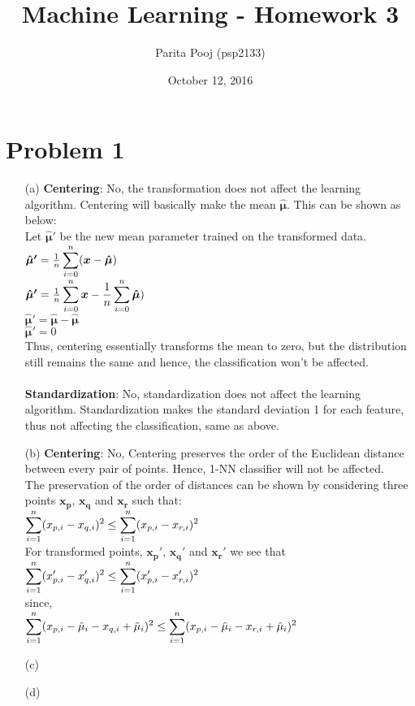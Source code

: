 \documentclass[fleqn]{article}
\title{Machine Learning - Homework 3}
\author{Parita Pooj (psp2133)}
\date{October 12, 2016}
\begin{document}
\maketitle
\setcounter{secnumdepth}{0}
\section{Problem 1}{}
\begin{itemize}
        \item[(a)]
		\textbf{Centering}: No, the transformation does not affect the learning algorithm.
		Centering will basically make the mean $\bm{\hat{\mu}}$. This can be shown as below:\\
		Let $\bm{\hat{\mu}'}$ be the new mean parameter trained on the transformed data.
		$ \bm{\hat{\mu}'} = \frac{1}{n} \smashoperator{\sum_{i = 0}^{n}} (\bm{x} - \bm{\hat{\mu}})$ \\
		$ \bm{\hat{\mu}'} = \frac{1}{n} \smashoperator{\sum_{i = 0}^{n}} \bm{x} 
		                  - \frac{1}{n} \smashoperator{\sum_{i = 0}^{n}} \bm{\hat{\mu}})$ \\
		$ \bm{\hat{\mu}'} = \bm{\hat{\mu}} - \bm{\hat{\mu}} $ \\
		$ \bm{\hat{\mu}'} = 0 $\\
		Thus, centering essentially transforms the mean to zero, but the distribution still remains the same and hence, the classification won't be affected.\\
		\\
		\textbf{Standardization}: No, standardization does not affect the learning algorithm.
		Standardization makes the standard deviation 1 for each feature, thus not affecting the classification, same as above.\\
        \item[(b)]
		\textbf{Centering}: No, Centering preserves the order of the Euclidean distance between every pair of points.
		Hence, 1-NN classifier will not be affected.\\
		The preservation of the order of distances can be shown by considering three points $\bm{x_p}$, $\bm{x_q}$ and $\bm{x_r}$ such that:\\
		$ \smashoperator{\sum_{i = 1}^{n}} (x_{p,i} - x_{q, i})^2 \leq \smashoperator{\sum_{i = 1}^{n}} (x_{p,i} - x_{r, i})^2 $\\
		For transformed points, $\bm{x_p'}$, $\bm{x_q'}$ and $\bm{x_r'}$ we see that \\
		$ \smashoperator{\sum_{i = 1}^{n}} (x_{p,i}' - x_{q, i}')^2 \leq \smashoperator{\sum_{i = 1}^{n}} (x_{p,i}' - x_{r, i}')^2 $\\
		since, \\
		$ \smashoperator{\sum_{i = 1}^{n}} (x_{p,i} - \hat{\mu}_i - x_{q, i} + \hat{\mu}_i)^2 
			\leq \smashoperator{\sum_{i = 1}^{n}} (x_{p,i} - \hat{\mu}_i - x_{r, i} + \hat{\mu}_i)^2$ \\
        \item[(c)]
        \item[(d)]
\end{itemize}
\end{document}
